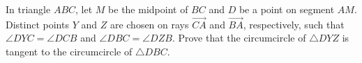 In triangle $ABC$, let $M$ be the midpoint of $BC$ and $D$ be a point on segment $AM$.
Distinct points $Y$ and $Z$ are chosen on rays $\overrightarrow{CA}$ and  $\overrightarrow{BA}$, respectively, such that $\angle DYC=\angle DCB$ and $\angle DBC=\angle DZB$.
Prove that the circumcircle of $\triangle DYZ$ is tangent to the circumcircle of $\triangle DBC$.

